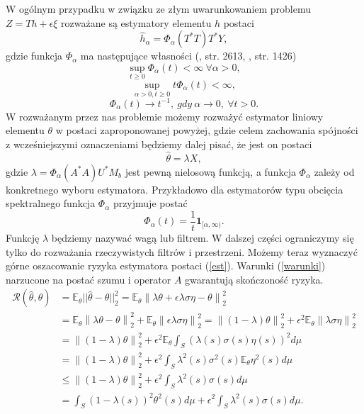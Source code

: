 \documentclass[man,mfiu]{mgrwms}
\newcommand{\norm}[1]{\left\lVert#1\right\rVert}
\begin{document}
W ogólnym przypadku w związku ze złym uwarunkowaniem problemu $Z=Th+\epsilon\xi$ rozważane są estymatory elementu $h$  postaci 
\begin{displaymath}
\hat{h}_{\alpha}=\Phi_{\alpha}(T^*T)T^*Y,
\end{displaymath}
gdzie funkcja $\Phi_{\alpha}$ ma następujące własności (\cite{bissantz}, str. 2613, \cite{mair}, str. 1426)
\begin{displaymath}
\sup_{t\geq 0}\Phi_{\alpha}(t)<\infty\ \forall \alpha>0,
\end{displaymath}
\begin{displaymath}
\sup_{\alpha>0,t\geq 0}t\Phi_{\alpha}(t)<\infty,
\end{displaymath}
\begin{displaymath}
\Phi_{\alpha}(t)\to t^{-1},\ gdy\  \alpha\to 0,\ \forall t>0.
\end{displaymath}
W rozważanym przez nas problemie możemy rozważyć estymator liniowy elementu $\theta$ w postaci zaproponowanej powyżej, gdzie celem zachowania spójności z wcześniejszymi oznaczeniami będziemy dalej pisać, że jest on postaci
\begin{equation}\label{est}
\hat{\theta}=\lambda X,
\end{equation}
gdzie $\lambda=\Phi_{\alpha}(A^*A)U^*M_b$ jest pewną nielosową funkcją, a funkcja $\Phi_{\alpha}$ zależy od konkretnego wyboru estymatora. Przykładowo dla estymatorów typu obcięcia spektralnego funkcja $\Phi_{\alpha}$ przyjmuje postać
\begin{displaymath}
\Phi_{\alpha}(t)=\frac{1}{t}\pmb{1}_{[\alpha,\infty)}.
\end{displaymath}
Funkcję $\lambda$ będziemy nazywać wagą lub filtrem. W dalszej części ograniczymy się tylko do rozważania rzeczywistych filtrów i przestrzeni. Możemy teraz wyznaczyć górne oszacowanie ryzyka estymatora postaci (\ref{est}). Warunki (\ref{warunki}) narzucone na postać szumu i operator $A$ gwarantują  skończoność ryzyka.
\begin{displaymath}
\begin{split}
\mathcal{R}(\hat{\theta},\theta )&= \mathbb{E}_{\theta}||\hat{\theta}-\theta||_2^2=\mathbb{E}_{\theta}\norm{\lambda\theta+\epsilon\lambda\sigma\eta-\theta}^2_2\\
&=\mathbb{E}_{\theta}\norm{\lambda\theta-\theta}^2_2+\mathbb{E}_{\theta}\norm{\epsilon\lambda\sigma\eta}^2_2=\norm{(1-\lambda)\theta}_2^2+\epsilon^2\mathbb{E}_{\theta}\norm{\lambda\sigma\eta}_2^2\\
&=\norm{(1-\lambda)\theta}_2^2+\epsilon^2\mathbb{E}_{\theta}\int_S\left(\lambda(s)\sigma(s)\eta(s)\right)^2d\mu\\
&=\norm{(1-\lambda)\theta}_2^2+\epsilon^2\int_S\lambda^2(s)\sigma^2(s)\mathbb{E}_{\theta}\eta^2(s)d\mu\\
&\leq \norm{(1-\lambda)\theta}_2^2+\epsilon^2\int_S\lambda^2(s)\sigma(s)d\mu\\
&=\int_S(1-\lambda(s))^2\theta^2(s)d\mu+\epsilon^2\int_S\lambda^2(s)\sigma(s)d\mu.
\end{split}
\end{displaymath}
\end{document}
